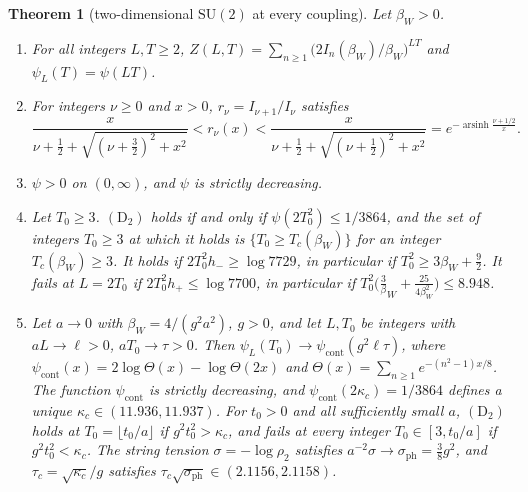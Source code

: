 \documentclass[11pt,a4paper]{amsart}
\newtheorem{theorem}{Theorem}[section]
\theoremstyle{definition}
\theoremstyle{remark}
\numberwithin{equation}{section}
\newcommand{\SU}{\mathrm{SU}}              %
\newcommand{\Zpart}[2]{Z(#1,#2)}           %
\newcommand{\psiT}[2]{\psi_{#1}(#2)}       %
\newcommand{\tzero}{t_0}                   %
\newcommand{\Tzero}{T_0}                   %
\newcommand{\betaW}{\beta_{W}}             %
\begin{document}
\begin{theorem}[two-dimensional $\SU(2)$ at every coupling]\label{thm:two-dim}
Let $\betaW>0$.
\begin{enumerate}[label=\textup{(\roman*)},leftmargin=*]
\item For all integers $L,T\ge2$, $\Zpart{L}{T}=\sum_{n\ge1}\bigl(2I_n(\betaW)/\betaW\bigr)^{LT}$ and $\psiT{L}{T}=\psi(LT)$.
\item For integers $\nu\ge0$ and $x>0$, $r_\nu=I_{\nu+1}/I_\nu$ satisfies
\begin{equation}\label{eq:2d-ratio}
\frac{x}{\nu+\frac12+\sqrt{(\nu+\frac32)^2+x^2}}<r_\nu(x)<\frac{x}{\nu+\frac12+\sqrt{(\nu+\frac12)^2+x^2}}=e^{-\operatorname{arsinh}\frac{\nu+1/2}{x}}.
\end{equation}
\item $\psi>0$ on $(0,\infty)$, and $\psi$ is strictly decreasing.
\item Let $\Tzero\ge3$. $(\mathrm D_2)$ holds if and only if $\psi(2\Tzero^2)\le1/3864$, and the set of integers $\Tzero\ge3$ at which it holds is $\{\Tzero\ge T_c(\betaW)\}$ for an integer $T_c(\betaW)\ge3$. It holds if $2\Tzero^2h_-\ge\log7729$, in particular if $\Tzero^2\ge3\betaW+\frac92$. It fails at $L=2\Tzero$ if $2\Tzero^2h_+\le\log7700$, in particular if $\Tzero^2\bigl(\frac3\betaW+\frac{25}{4\betaW^2}\bigr)\le8.948$.
\item Let $a\to0$ with $\betaW=4/(g^2a^2)$, $g>0$, and let $L,\Tzero$ be integers with $aL\to\ell>0$, $a\Tzero\to\tau>0$. Then $\psiT{L}{\Tzero}\to\psi_{\mathrm{cont}}(g^2\ell\tau)$, where $\psi_{\mathrm{cont}}(x)=2\log\Theta(x)-\log\Theta(2x)$ and $\Theta(x)=\sum_{n\ge1}e^{-(n^2-1)x/8}$. The function $\psi_{\mathrm{cont}}$ is strictly decreasing, and $\psi_{\mathrm{cont}}(2\kappa_c)=1/3864$ defines a unique $\kappa_c\in(11.936,11.937)$. For $\tzero>0$ and all sufficiently small $a$, $(\mathrm D_2)$ holds at $\Tzero=\lfloor\tzero/a\rfloor$ if $g^2\tzero^2>\kappa_c$, and fails at every integer $\Tzero\in[3,\tzero/a]$ if $g^2\tzero^2<\kappa_c$. The string tension $\sigma=-\log\rho_2$ satisfies $a^{-2}\sigma\to\sigma_{\mathrm{ph}}=\frac38g^2$, and $\tau_c=\sqrt{\kappa_c}/g$ satisfies $\tau_c\sqrt{\sigma_{\mathrm{ph}}}\in(2.1156,2.1158)$.
\end{enumerate}
\end{theorem}
\end{document}
